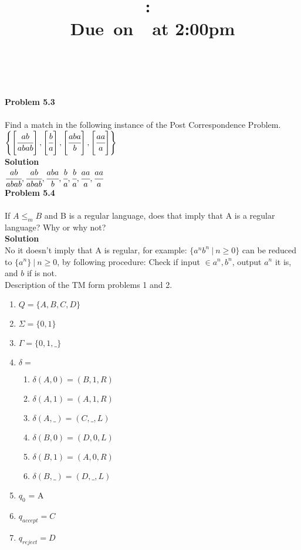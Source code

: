 \documentclass{article}
\title{
  \vspace{2in}
  \textmd{\textbf{\hmwkClass:\ \hmwkTitle}}\\
  \normalsize\vspace{0.1in}\small{Due\ on\ \hmwkDueDate\ at 2:00pm}\\
  \vspace{0.1in}\large{\textit{\hmwkClassInstructor\ \hmwkClassTime}}
  \vspace{3in}
}
\author{\textbf{\hmwkAuthorName}}
\date{}
\newcommand\curl[1]{\{#1\}}
\newcommand{\problem}[1]{\large{\textbf{Problem #1}}\\}
\begin{document}
\maketitle

\pagebreak

\problem{5.3} \\
Find a match in the following instance of the Post Correspondence Problem.\\

$\left \{ \left [ \cfrac{ab}{abab} \right ], \left [ \cfrac{b}{a} \right ], \left [ \cfrac{aba}{b} \right ], \left [ \cfrac{aa}{a} \right ] \right \}$ \\

\textbf{Solution}\\

$  \cfrac{ab}{abab}  , \cfrac{ab}{abab}, \cfrac{aba}{b} , \cfrac{b}{a} , \cfrac{b}{a} ,   \cfrac{aa}{a}, \cfrac{aa}{a}  $  \\

\problem{5.4} \\

If $A \leq _m B$ and B is a regular language, does that imply that A is a regular language? Why or why not?\\

\textbf{Solution}\\

No it doesn't imply that A is regular, for example: $\curl{a^nb^n\ | \ n \geq 0}$ can be reduced to $\curl{a^n}\ |\ n \geq 0$, by 
following procedure:
Check if input $\in a^n,b^n$, output $a^n$ it is, and $b$ if is not. \\

Description of the TM form problems 1 and 2.\\
\begin{enumerate}[1., leftmargin = 0.5cm]
\itemsep0em
\item $Q = \curl{A,B,C,D}$
\item $\Sigma = \curl{0,1}$
\item $\Gamma = \curl{0,1,\_}$
\item $\delta = $
    \begin{enumerate}[1., leftmargin = 0.5cm]
    \itemsep0em
    \item $\delta (A,0) = (B,1,R)$
    \item $\delta (A,1) = (A,1,R)$
    \item $\delta (A,\_) = (C,\_,L)$

    \item $\delta (B,0) = (D,0,L)$
    \item $\delta (B,1) = (A,0,R)$
    \item $\delta (B,\_) = (D,\_,L)$
    \end{enumerate}
\item $q_0$ = A
\item  $q_{accept} = C$
\item  $q_{reject} = D$
\end{enumerate}
\end{document}
